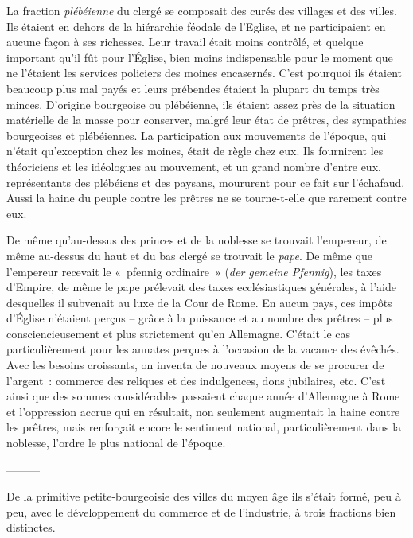\documentclass[french,twoside]{book} %
\begin{document}
La fraction \emph{plébéienne} du clergé se composait des curés des villages et des villes. Ils étaient en dehors de la hiérarchie féodale de l’Eglise, et ne participaient en aucune façon à ses richesses. Leur travail était moins contrôlé, et quelque important qu’il fût pour l’Église, bien moins indispensable pour le moment que ne l’étaient les services policiers des moines encasernés. C’est pourquoi ils étaient beaucoup plus mal payés et leurs prébendes étaient la plupart du temps très minces. D’origine bourgeoise ou plébéienne, ils étaient assez près de la situation matérielle de la masse pour conserver, malgré leur état de prêtres, des sympathies bourgeoises et plébéiennes. La participation aux mouvements de l’époque, qui n’était qu’exception chez les moines, était de règle chez eux. Ils fournirent les théoriciens et les idéologues au mouvement, et un grand nombre d’entre eux, représentants des plébéiens et des paysans, moururent pour ce fait sur l’échafaud. Aussi la haine du peuple contre les prêtres ne se tourne-t-elle que rarement contre eux.\par
\bigbreak
\noindent De même qu’au-dessus des princes et de la noblesse se trouvait l’empereur, de même au-dessus du haut et du bas clergé se trouvait le \emph{pape}. De même que l’empereur recevait le « pfennig ordinaire » (\emph{der gemeine Pfennig}), les taxes d’Empire, de même le pape prélevait des taxes ecclésiastiques générales, à l’aide desquelles il subvenait au luxe de la Cour de Rome. En aucun pays, ces impôts d’Église n’étaient perçus – grâce à la puissance et au nombre des prêtres – plus consciencieusement et plus strictement qu’en Allemagne. C’était le cas particulièrement pour les annates perçues à l’occasion de la vacance des évêchés. Avec les besoins croissants, on inventa de nouveaux moyens de se procurer de l’argent : commerce des reliques et des indulgences, dons jubilaires, etc. C’est ainsi que des sommes considérables passaient chaque année d’Allemagne à Rome et l’oppression accrue qui en résultait, non seulement augmentait la haine contre les prêtres, mais renforçait encore le sentiment national, particulièrement dans la noblesse, l’ordre le plus national de l’époque.\par
———\par
\noindent De la primitive petite-bourgeoisie des villes du moyen âge ils s’était formé, peu à peu, avec le développement du commerce et de l’industrie, à trois fractions bien distinctes.\par
\end{document}
